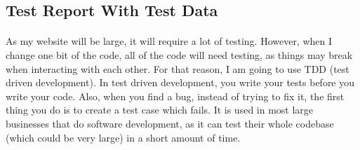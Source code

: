 \subsection{Test Report With Test Data}
\paragraph{}
As my website will be large, it will require a lot of testing. However, when I change one bit of the code, all of the code will need testing, as things may break when interacting with each other. For that reason, I am going to use TDD (test driven development). In test driven development, you write your tests before you write your code. Also, when you find a bug, instead of trying to fix it, the first thing you do is to create a test case which fails. It is used in most large businesses that do software development, as it can test their whole codebase (which could be very large) in a short amount of time.
